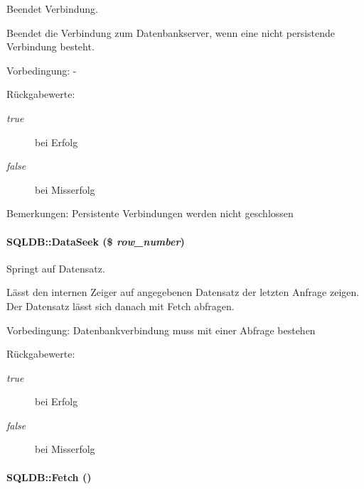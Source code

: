 Beendet Verbindung. 

Beendet die Verbindung zum Datenbankserver, wenn eine nicht persistende Verbindung besteht. \begin{Desc}
\item[Vorbedingung:]- \end{Desc}
\begin{Desc}
\item[R\"{u}ckgabewerte:]
\begin{description}
\item[{\em true}]bei Erfolg \item[{\em false}]bei Misserfolg \end{description}
\end{Desc}
\begin{Desc}
\item[Bemerkungen:]Persistente Verbindungen werden nicht geschlossen \end{Desc}
\hypertarget{classSQLDB_0766b746a81684e014c235db35818e54}{
\paragraph[DataSeek]{\setlength{\rightskip}{0pt plus 5cm}SQLDB::Data\-Seek (\$ {\em row\_\-number})}\hfill}
\label{classSQLDB_0766b746a81684e014c235db35818e54}


Springt auf Datensatz. 

Lässt den internen Zeiger auf angegebenen Datensatz der letzten Anfrage zeigen. Der Datensatz lässt sich danach mit Fetch abfragen. \begin{Desc}
\item[Vorbedingung:]Datenbankverbindung muss mit einer Abfrage bestehen \end{Desc}
\begin{Desc}
\item[R\"{u}ckgabewerte:]
\begin{description}
\item[{\em true}]bei Erfolg \item[{\em false}]bei Misserfolg \end{description}
\end{Desc}
\hypertarget{classSQLDB_a55c00ce1de0e50e0a58cae61892ba35}{
\paragraph[Fetch]{\setlength{\rightskip}{0pt plus 5cm}SQLDB::Fetch ()}\hfill}
\label{classSQLDB_a55c00ce1de0e50e0a58cae61892ba35}


